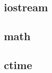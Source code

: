 \documentclass[10pt,a4paper]{scrartcl}
\begin{document}
\begin{multicols*}{2}
\subsection{iostream}

\subsection{math}

\subsection{ctime}







\end{multicols*}
\end{document}
